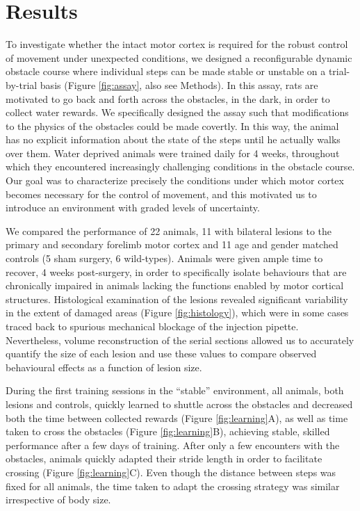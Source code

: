 \section{Results}

To investigate whether the intact motor cortex is required for the robust control of movement under unexpected conditions, we designed a reconfigurable dynamic obstacle course where individual steps can be made stable or unstable on a trial-by-trial basis (Figure \ref{fig:assay}, also see Methods). In this assay, rats are motivated to go back and forth across the obstacles, in the dark, in order to collect water rewards. We specifically designed the assay such that modifications to the physics of the obstacles could be made covertly. In this way, the animal has no explicit information about the state of the steps until he actually walks over them. Water deprived animals were trained daily for 4 weeks, throughout which they encountered increasingly challenging conditions in the obstacle course. Our goal was to characterize precisely the conditions under which motor cortex becomes necessary for the control of movement, and this motivated us to introduce an environment with graded levels of uncertainty.

We compared the performance of 22 animals, 11 with bilateral lesions to the primary and secondary forelimb motor cortex and 11 age and gender matched controls (5 sham surgery, 6 wild-types). Animals were given ample time to recover, 4 weeks post-surgery, in order to specifically isolate behaviours that are chronically impaired in animals lacking the functions enabled by motor cortical structures. Histological examination of the lesions revealed significant variability in the extent of damaged areas (Figure \ref{fig:histology}), which were in some cases traced back to spurious mechanical blockage of the injection pipette. Nevertheless, volume reconstruction of the serial sections allowed us to accurately quantify the size of each lesion and use these values to compare observed behavioural effects as a function of lesion size.

During the first training sessions in the ``stable'' environment, all animals, both lesions and controls, quickly learned to shuttle across the obstacles and decreased both the time between collected rewards (Figure \ref{fig:learning}A), as well as time taken to cross the obstacles (Figure \ref{fig:learning}B), achieving stable, skilled performance after a few days of training. After only a few encounters with the obstacles, animals quickly adapted their stride length in order to facilitate crossing (Figure \ref{fig:learning}C). Even though the distance between steps was fixed for all animals, the time taken to adapt the crossing strategy was similar irrespective of body size.

